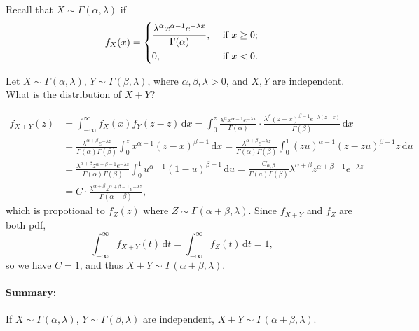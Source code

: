 Recall that \(X \sim \Gamma (\alpha , \lambda )\) if 
\[
    f_X(x) = \begin{dcases}
        \frac{\lambda ^\alpha x^{\alpha - 1} e^{-\lambda x}}{\Gamma (\alpha )}, &\text{ if } x \ge 0 ;\\
        0, &\text{ if } x < 0.
    \end{dcases}
\] 
\begin{eg}
    Let \(X \sim \Gamma (\alpha , \lambda )\), \(Y \sim \Gamma (\beta , \lambda )\), where \(\alpha , \beta , \lambda > 0\), and \(X, Y\) are independent. What is the distribution of \(X + Y\)?     
\end{eg}
\begin{explanation}
    \begin{align*}
        f_{X + Y}(z) &= \int _{-\infty }^{\infty } f_X(x) f_Y(z - z) \, \mathrm{d} x = \int _0^z \frac{\lambda ^\alpha x^{\alpha - 1} e^{-\lambda x}}{\Gamma (\alpha )} \cdot \frac{\lambda ^\beta (z - x)^{\beta - 1} e^{-\lambda (z - x)}}{\Gamma (\beta )} \, \mathrm{d} x \\
        &= \frac{\lambda ^{\alpha + \beta} e^{-\lambda z}}{\Gamma (\alpha ) \Gamma (\beta )} \int _0^z x^{\alpha - 1} (z - x)^{\beta - 1} \, \mathrm{d} x = \frac{\lambda ^{\alpha + \beta} e^{-\lambda z}}{\Gamma (\alpha ) \Gamma (\beta )} \int _0^1 (zu)^{\alpha - 1} (z - zu)^{\beta - 1} z \, \mathrm{d} u \\
        &= \frac{\lambda ^{\alpha + \beta } z^{\alpha + \beta - 1} e^{-\lambda z}}{\Gamma (\alpha ) \Gamma (\beta )} \int _0^1 u^{\alpha - 1} (1 - u)^{\beta - 1} \, \mathrm{d} u = \frac{C_{\alpha , \beta}}{\Gamma (a) \Gamma (\beta )} \lambda ^{\alpha + \beta } z^{\alpha + \beta - 1} e^{-\lambda z} \\
        &= C \cdot \frac{\lambda ^{\alpha + \beta } z^{\alpha + \beta - 1} e^{-\lambda z}}{\Gamma (\alpha + \beta )},    
    \end{align*}
    which is propotional to \(f_Z(z)\) where \(Z \sim \Gamma (\alpha + \beta , \lambda )\). Since \(f_{X+Y}\) and \(f_Z\) are both pdf,
    \[
        \int _{-\infty }^{\infty } f_{X+Y}(t) \, \mathrm{d} t = \int _{-\infty }^{\infty} f_Z(t) \, \mathrm{d} t = 1,  
    \]
    so we have \(C = 1\), and thus \(X+Y \sim \Gamma (\alpha + \beta , \lambda )\). 

    \paragraph{Summary:} If \(X \sim \Gamma (\alpha , \lambda )\), \(Y \sim \Gamma (\beta , \lambda )\) are independent, \(X+Y \sim \Gamma (\alpha + \beta , \lambda )\).       
\end{explanation}

